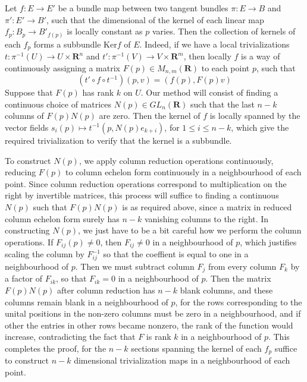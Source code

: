 \begin{example}
    Let $f: E \to E'$ be a bundle map between two tangent bundles $\pi: E \to B$ and $\pi': E' \to B'$, such that the dimensional of the kernel of each linear map $f_p: B_p \to B'_{f(p)}$ is locally constant as $p$ varies. Then the collection of kernels of each $f_p$ forms a subbundle $\text{Ker} f$ of $E$. Indeed, if we have a local trivializations $t: \pi^{-1}(U) \to U \times \mathbf{R}^n$ and $t': \pi^{-1}(V) \to V \times \mathbf{R}^m$, then locally $f$ is a way of continuously assigning a matrix $F(p) \in M_{n,m}(\mathbf{R})$ to each point $p$, such that
    \[ (t' \circ f \circ t^{-1})(p,v) = (f(p), F(p) v) \]
    Suppose that $F(p)$ has rank $k$ on $U$. Our method will consist of finding a continuous choice of matrices $N(p) \in GL_n(\mathbf{R})$ such that the last $n-k$ columns of $F(p) N(p)$ are zero. Then the kernel of $f$ is locally spanned by the vector fields $s_i(p) \mapsto t^{-1}(p, N(p)e_{k+i})$, for $1 \leq i \leq n-k$, which give the required trivialization to verify that the kernel is a subbundle.

    To construct $N(p)$, we apply column reduction operations continuously, reducing $F(p)$ to column echelon form continuously in a neighbourhood of each point. Since column reduction operations correspond to multiplication on the right by invertible matrices, this process will suffice to finding a continuous $N(p)$ such that $F(p) N(p)$ is as required above, since a matrix in reduced column echelon form surely has $n-k$ vanishing columns to the right. In constructing $N(p)$, we just have to be a bit careful how we perform the column operations. If $F_{ij}(p) \neq 0$, then $F_{ij} \neq 0$ in a neighbourhood of $p$, which justifies scaling the column by $F_{ij}^{-1}$ so that the coeffient is equal to one in a neighbourhood of $p$. Then we must subtract column $F_j$ from every column $F_k$ by a factor of $F_{ik}$, so that $F_{ik} = 0$ in a neighbourhood of $p$. Then the matrix $F(p) N(p)$ after column reduction has $n-k$ blank columns, and these columns remain blank in a neighbourhood of $p$, for the rows corresponding to the unital positions in the non-zero columns must be zero in a neighbourhood, and if other the entries in other rows became nonzero, the rank of the function would increase, contradicting the fact that $F$ is rank $k$ in a neighbourhood of $p$. This completes the proof, for the $n-k$ sections spanning the kernel of each $f_p$ suffice to construct $n-k$ dimensional trivialization maps in a neighbourhood of each point.
\end{example}

